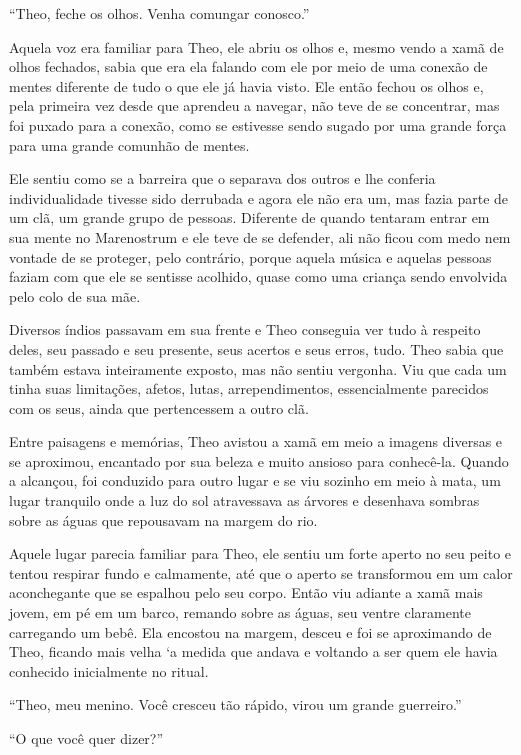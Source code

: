 ``Theo, feche os olhos. Venha comungar conosco.''

Aquela voz era familiar para Theo, ele abriu os olhos e, mesmo vendo a
xamã de olhos fechados, sabia que era ela falando com ele por meio de
uma conexão de mentes diferente de tudo o que ele já havia visto. Ele
então fechou os olhos e, pela primeira vez desde que aprendeu a navegar,
não teve de se concentrar, mas foi puxado para a conexão, como se
estivesse sendo sugado por uma grande força para uma grande comunhão de
mentes.

Ele sentiu como se a barreira que o separava dos outros e lhe conferia
individualidade tivesse sido derrubada e agora ele não era um, mas fazia
parte de um clã, um grande grupo de pessoas. Diferente de quando
tentaram entrar em sua mente no Marenostrum e ele teve de se defender,
ali não ficou com medo nem vontade de se proteger, pelo contrário,
porque aquela música e aquelas pessoas faziam com que ele se sentisse
acolhido, quase como uma criança sendo envolvida pelo colo de sua mãe.

Diversos índios passavam em sua frente e Theo conseguia ver tudo à
respeito deles, seu passado e seu presente, seus acertos e seus erros,
tudo. Theo sabia que também estava inteiramente exposto, mas não sentiu
vergonha. Viu que cada um tinha suas limitações, afetos, lutas,
arrependimentos, essencialmente parecidos com os seus, ainda que
pertencessem a outro clã.

Entre paisagens e memórias, Theo avistou a xamã em meio a imagens
diversas e se aproximou, encantado por sua beleza e muito ansioso para
conhecê-la. Quando a alcançou, foi conduzido para outro lugar e se viu
sozinho em meio à mata, um lugar tranquilo onde a luz do sol atravessava
as árvores e desenhava sombras sobre as águas que repousavam na margem
do rio.

Aquele lugar parecia familiar para Theo, ele sentiu um forte aperto no
seu peito e tentou respirar fundo e calmamente, até que o aperto se
transformou em um calor aconchegante que se espalhou pelo seu corpo.
Então viu adiante a xamã mais jovem, em pé em um barco, remando sobre as
águas, seu ventre claramente carregando um bebê. Ela encostou na margem,
desceu e foi se aproximando de Theo, ficando mais velha `a medida que
andava e voltando a ser quem ele havia conhecido inicialmente no ritual.

``Theo, meu menino. Você cresceu tão rápido, virou um grande
guerreiro.''

``O que você quer dizer?''


